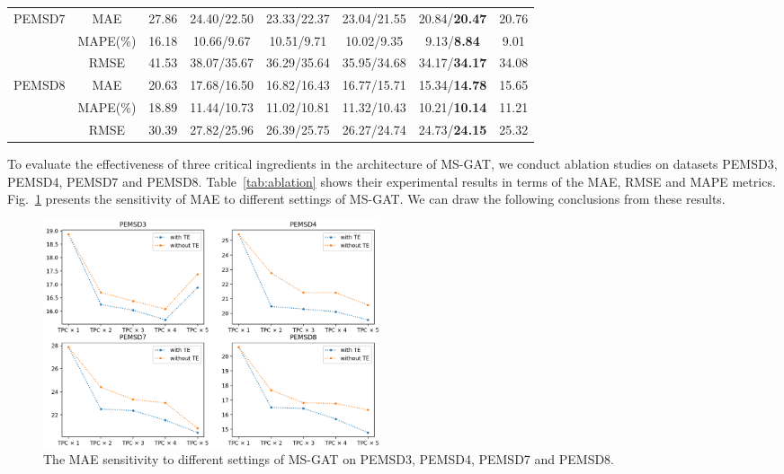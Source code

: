 \begin{table}[!htb]
\begin{tabular}{cccccccc}
        \hline
        \multicolumn{1}{c|}{\multirow{3}{*}{PEMSD7}} & \multicolumn{1}{c|}{MAE}      & 27.86 & 24.40/22.50 & 23.33/22.37 & 23.04/21.55          & 20.84/\textbf{20.47} & 20.76 \\
        \multicolumn{1}{c|}{}                        & \multicolumn{1}{c|}{MAPE(\%)} & 16.18 & 10.66/9.67  & 10.51/9.71  & 10.02/9.35           & 9.13/\textbf{8.84}   & 9.01 \\
        \multicolumn{1}{c|}{}                        & \multicolumn{1}{c|}{RMSE}     & 41.53 & 38.07/35.67 & 36.29/35.64 & 35.95/34.68          & 34.17/\textbf{34.17} & 34.08 \\
        \hline
        \multicolumn{1}{c|}{\multirow{3}{*}{PEMSD8}} & \multicolumn{1}{c|}{MAE}      & 20.63 & 17.68/16.50 & 16.82/16.43 & 16.77/15.71          & 15.34/\textbf{14.78} & 15.65 \\
        \multicolumn{1}{c|}{}                        & \multicolumn{1}{c|}{MAPE(\%)} & 18.89 & 11.44/10.73 & 11.02/10.81 & 11.32/10.43          & 10.21/\textbf{10.14} & 11.21 \\
        \multicolumn{1}{c|}{}                        & \multicolumn{1}{c|}{RMSE}     & 30.39 & 27.82/25.96 & 26.39/25.75 & 26.27/24.74          & 24.73/\textbf{24.15} & 25.32 \\
        \bottomrule[2pt]
    \end{tabular}
\end{table}

To evaluate the effectiveness of three critical ingredients in the architecture of MS-GAT, we conduct ablation studies on datasets PEMSD3, PEMSD4, PEMSD7 and PEMSD8. Table~\ref{tab:ablation} shows their experimental results in terms of the   MAE, RMSE and MAPE metrics. Fig.~\ref{fig:ablation} presents the sensitivity of MAE to different settings of MS-GAT. We can draw the following conclusions from these results.

\begin{figure}[!ht]
    \centering
    \includegraphics[width=0.48\textwidth]{pictures/Ablation.png}
    \caption{The MAE sensitivity to different settings of MS-GAT on PEMSD3, PEMSD4, PEMSD7 and PEMSD8.}
    \label{fig:ablation}
\end{figure}

